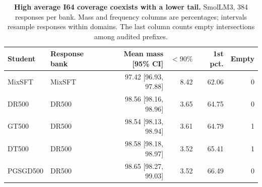 \begin{table}[!htbp]
\centering\small
\setlength{\tabcolsep}{4pt}
\caption{\textbf{High average I64 coverage coexists with a lower tail.} SmolLM3, 384 responses per bank. Mass and frequency columns are percentages; intervals resample responses within domains. The last column counts empty intersections among audited prefixes.}
\label{tab:smollm_coverage}
\begin{tabular}{llrrrr}
\toprule
Student & Response bank & Mean mass [95\% CI] & $<90\%$ & 1st pct. & Empty \\
\midrule
MixSFT & MixSFT & 97.42 [96.93, 97.88] & 8.42 & 62.06 & 0 \\
DR500 & DR500 & 98.56 [98.16, 98.96] & 3.65 & 64.75 & 0 \\
GT500 & DR500 & 98.54 [98.13, 98.94] & 3.61 & 64.79 & 1 \\
DT500 & DR500 & 98.58 [98.18, 98.97] & 3.52 & 65.41 & 1 \\
PGSGD500 & DR500 & 98.65 [98.27, 99.03] & 3.52 & 66.49 & 0 \\
\bottomrule
\end{tabular}
\end{table}
